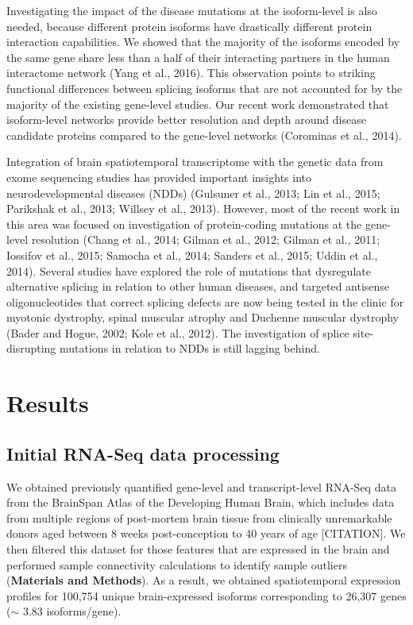 Investigating the impact of the disease mutations at the isoform-level is also needed, because different protein isoforms have drastically different protein interaction capabilities. We showed that the majority of the isoforms encoded by the same gene share less than a half of their interacting partners in the human interactome network (Yang et al., 2016). This observation points to striking functional differences between splicing isoforms that are not accounted for by the majority of the existing gene-level studies. Our recent work demonstrated that isoform-level networks provide better resolution and depth around disease candidate proteins compared to the gene-level networks (Corominas et al., 2014). 

Integration of brain spatiotemporal transcriptome with the genetic data from exome sequencing studies has provided important insights into neurodevelopmental diseases (NDDs) (Gulsuner et al., 2013; Lin et al., 2015; Parikshak et al., 2013; Willsey et al., 2013). However, most of the recent work in this area was focused on investigation of protein-coding mutations at the gene-level resolution (Chang et al., 2014; Gilman et al., 2012; Gilman et al., 2011; Iossifov et al., 2015; Samocha et al., 2014; Sanders et al., 2015; Uddin et al., 2014). Several studies have explored the role of mutations that dysregulate alternative splicing in relation to other human diseases, and targeted antisense oligonucleotides that correct splicing defects are now being tested in the clinic for myotonic dystrophy, spinal muscular atrophy and Duchenne muscular dystrophy (Bader and Hogue, 2002; Kole et al., 2012). The investigation of splice site-disrupting mutations in relation to NDDs is still lagging behind.

\section{Results}

\subsection{Initial RNA-Seq data processing}

We obtained previously quantified gene-level and transcript-level RNA-Seq data from the BrainSpan Atlas of the Developing Human Brain, which includes data from multiple regions of post-mortem brain tissue from clinically unremarkable donors aged between 8 weeks post-conception to 40 years of age [CITATION]. We then filtered this dataset for those features that are expressed in the brain and performed sample connectivity calculations to identify sample outliers (\textbf{Materials and Methods}). As a result, we obtained spatiotemporal expression profiles for 100,754 unique brain-expressed isoforms corresponding to 26,307 genes ($\sim$ 3.83 isoforms/gene). \par

